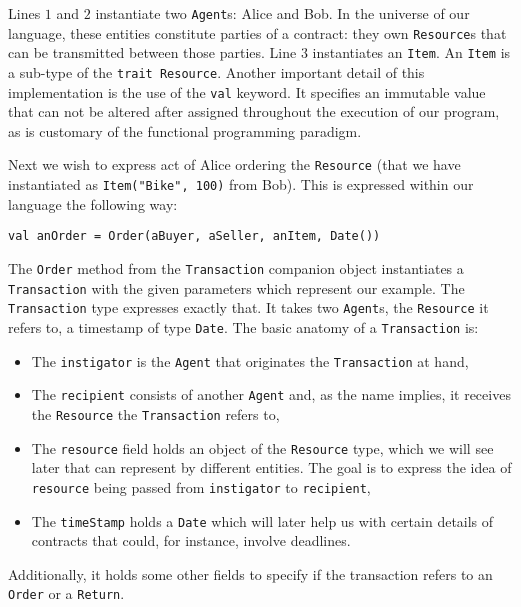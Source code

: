 \documentclass{ituthesis}
\begin{document}
Lines $1$ and $2$ instantiate two \texttt{Agent}s: Alice and Bob. In the universe of our language, these entities constitute parties of a contract: they own \texttt{Resource}s that can be transmitted between those parties.\newline
Line $3$ instantiates an \texttt{Item}. An \texttt{Item} is a sub-type of the \texttt{trait Resource}.\newline
Another important detail of this implementation is the use of the \texttt{val} keyword. It specifies an immutable value that can not be altered after assigned throughout the execution of our program, as is customary of the functional programming paradigm.

Next we wish to express act of Alice ordering the \texttt{Resource} (that we have instantiated as \texttt{Item("Bike", 100)} from Bob). This is expressed within our language the following way:
\begin{lstlisting}
val anOrder = Order(aBuyer, aSeller, anItem, Date())
\end{lstlisting}
The \texttt{Order} method from the \texttt{Transaction} companion object instantiates a \texttt{Transaction} with the given parameters which represent our example. The \texttt{Transaction} type expresses exactly that. It takes two \texttt{Agent}s, the \texttt{Resource} it refers to, a timestamp of type \texttt{Date}. The basic anatomy of a \texttt{Transaction} is:
\begin{itemize}
    \item The \texttt{instigator} is the \texttt{Agent} that originates the \texttt{Transaction} at hand,
    \item The \texttt{recipient} consists of another \texttt{Agent} and, as the name implies, it receives the \texttt{Resource} the \texttt{Transaction} refers to,
    \item The \texttt{resource} field holds an object of the \texttt{Resource} type, which we will see later that can represent by different entities. The goal is to express the idea of \texttt{resource} being passed from \texttt{instigator} to \texttt{recipient},
    \item The \texttt{timeStamp} holds a \texttt{Date} which will later help us with certain details of contracts that could, for instance, involve deadlines.
\end{itemize}
Additionally, it holds some other fields to specify if the transaction refers to an \texttt{Order} or a \texttt{Return}.
\end{document}
